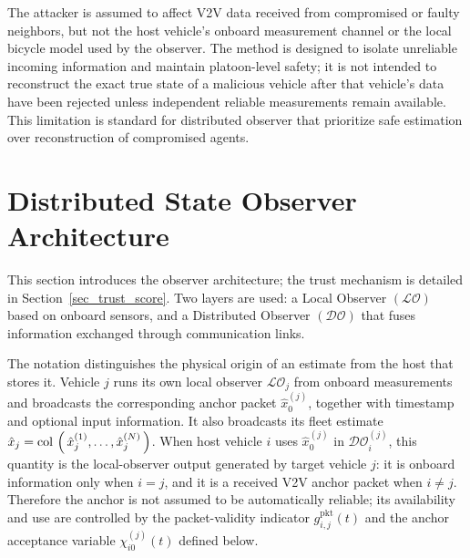 \documentclass[letterpaper,journal]{IEEEtran}
\def\col#1{\mathop{{\rm col}\,\left(\,#1\,\right)}}
\def\LO{\mathcal{LO}} %
\def\DO{\mathcal{DO}} %
\begin{document}
The attacker is assumed to affect V2V data received from compromised or faulty neighbors, but not the host vehicle's onboard measurement channel or the local bicycle model used by the observer. The method is designed to isolate unreliable incoming information and maintain platoon-level safety; it is not intended to reconstruct the exact true state of a malicious vehicle after that vehicle's data have been rejected unless independent reliable measurements remain available. This limitation is standard for distributed observer that prioritize safe estimation over reconstruction of compromised agents.

\section{Distributed State Observer Architecture}\label{sec_distributed_observer}
This section introduces the observer architecture; the trust mechanism is detailed in Section~\ref{sec_trust_score}. Two layers are used: a Local Observer $(\LO)$ based on onboard sensors, and a Distributed Observer $(\DO)$ that fuses information exchanged through communication links.

The notation distinguishes the physical origin of an estimate from the host that stores it. Vehicle $j$ runs its own local observer $\LO_j$ from onboard measurements and broadcasts the corresponding anchor packet $\hat{x}_0^{(j)}$, together with timestamp and optional input information. It also broadcasts its fleet estimate $\hat{x}_j=\col{\hat{x}_j^{(1)},\ldots,\hat{x}_j^{(N)}}$. When host vehicle $i$ uses $\hat{x}_0^{(j)}$ in $\DO_i^{(j)}$, this quantity is the local-observer output generated by target vehicle $j$: it is onboard information only when $i=j$, and it is a received V2V anchor packet when $i\neq j$. Therefore the anchor is not assumed to be automatically reliable; its availability and use are controlled by the packet-validity indicator $g_{i,j}^{\mathrm{pkt}}(t)$ and the anchor acceptance variable $\chi_{i0}^{(j)}(t)$ defined below.
\end{document}

